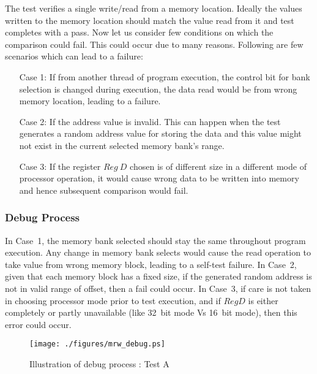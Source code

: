 The test verifies a single write/read from a memory location. Ideally the values written to the memory location should match the value read from it and test completes with a pass. Now let us consider few conditions on which the comparison could fail. This could occur due to many reasons. Following are few scenarios which can lead to a failure:
\begin{itemize}
\item [Case 1:] If from another thread of program execution, the control bit for bank selection is changed during execution, the data read would be from wrong memory location, leading to a failure. \label{mrw:case1}

\item [Case 2:] If the address value is invalid. This can happen when the test generates a random address value for storing the data and this value might not exist in the current selected memory bank's range. \label{mrw:case2}

\item [Case 3:] If the register $Reg~D$ chosen is of different  size in a different mode of processor operation, it would cause wrong data to be written into memory and hence subsequent comparison would  fail. \label{mrw:case3}
\end{itemize}

\subsubsection{Debug Process}
In Case~1, the memory bank selected should stay the same throughout program execution. Any change in memory bank selects would cause the read operation to take value from wrong memory block, leading to a self-test failure. 
In Case~2, given that each memory block has a fixed size, if the generated random address is not in valid range of offset, then a fail could occur. 
In Case~3, if care is not taken in choosing processor mode prior to test execution, and if $Reg D$ is either completely or partly unavailable (like 32~bit mode Vs 16~bit mode), then this error could occur.

\begin{figure}[h]
\centering

\texttt{[image: ./figures/mrw\_debug.ps]}
\caption{Illustration of debug process : Test A} 
\label{fig:mrw_debug.ps}
\end{figure}

